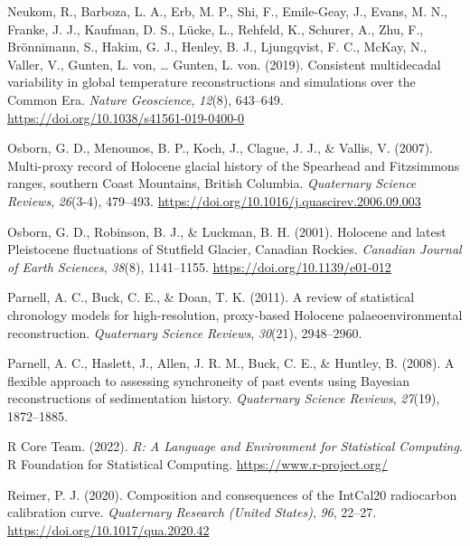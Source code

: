 \documentclass[
  letterpaper,
  DIV=11,
  numbers=noendperiod]{scrartcl}
\newlength{\cslhangindent}
\newlength{\cslentryspacingunit} %
\newenvironment{CSLReferences}[2] %
 {%
  \setlength{\parindent}{0pt}
  \ifodd #1
  \let\oldpar\par
  \def\par{\hangindent=\cslhangindent\oldpar}
  \fi
  \setlength{\parskip}{#2\cslentryspacingunit}
 }%
 {}
\begin{document}
\begin{CSLReferences}{1}{0}
\leavevmode{}%
Neukom, R., Barboza, L. A., Erb, M. P., Shi, F., Emile-Geay, J., Evans,
M. N., Franke, J. J., Kaufman, D. S., Lücke, L., Rehfeld, K., Schurer,
A., Zhu, F., Brönnimann, S., Hakim, G. J., Henley, B. J., Ljungqvist, F.
C., McKay, N., Valler, V., Gunten, L. von, \ldots{} Gunten, L. von.
(2019). {Consistent multidecadal variability in global temperature
reconstructions and simulations over the Common Era}. \emph{Nature
Geoscience}, \emph{12}(8), 643--649.
\url{https://doi.org/10.1038/s41561-019-0400-0}

\leavevmode{}%
Osborn, G. D., Menounos, B. P., Koch, J., Clague, J. J., \& Vallis, V.
(2007). {Multi-proxy record of Holocene glacial history of the Spearhead
and Fitzsimmons ranges, southern Coast Mountains, British Columbia}.
\emph{Quaternary Science Reviews}, \emph{26}(3-4), 479--493.
\url{https://doi.org/10.1016/j.quascirev.2006.09.003}

\leavevmode{}%
Osborn, G. D., Robinson, B. J., \& Luckman, B. H. (2001). {Holocene and
latest Pleistocene fluctuations of Stutfield Glacier, Canadian Rockies}.
\emph{Canadian Journal of Earth Sciences}, \emph{38}(8), 1141--1155.
\url{https://doi.org/10.1139/e01-012}

\leavevmode{}%
Parnell, A. C., Buck, C. E., \& Doan, T. K. (2011). {A review of
statistical chronology models for high-resolution, proxy-based Holocene
palaeoenvironmental reconstruction}. \emph{Quaternary Science Reviews},
\emph{30}(21), 2948--2960.

\leavevmode{}%
Parnell, A. C., Haslett, J., Allen, J. R. M., Buck, C. E., \& Huntley,
B. (2008). {A flexible approach to assessing synchroneity of past events
using Bayesian reconstructions of sedimentation history}.
\emph{Quaternary Science Reviews}, \emph{27}(19), 1872--1885.

\leavevmode{}%
R Core Team. (2022). \emph{{R: A Language and Environment for
Statistical Computing}}. R Foundation for Statistical Computing.
\url{https://www.r-project.org/}

\leavevmode{}%
Reimer, P. J. (2020). {Composition and consequences of the IntCal20
radiocarbon calibration curve}. \emph{Quaternary Research (United
States)}, \emph{96}, 22--27. \url{https://doi.org/10.1017/qua.2020.42}


\end{CSLReferences}
\end{document}
